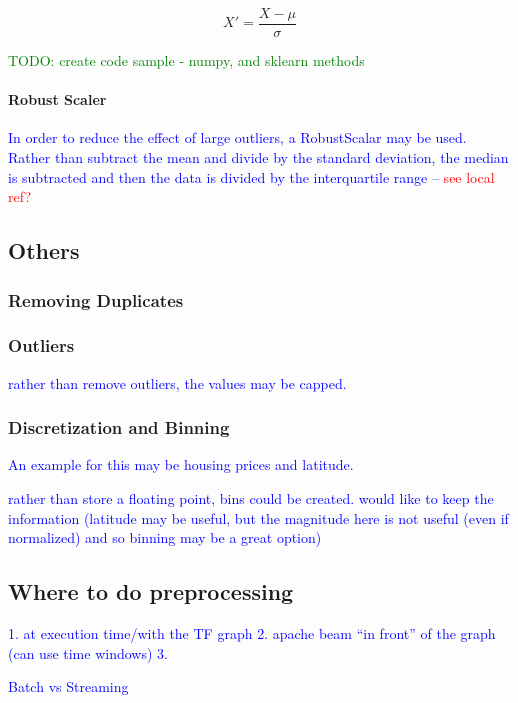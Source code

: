 \begin{equation}
{X' = \frac{X - \mu}{\sigma}}
\label{eq:preprocess_standardization}
\end{equation}

\textcolor{green}{TODO: create code sample - numpy, and sklearn methods}

\paragraph{Robust Scaler}

\textcolor{blue}{In order to reduce the effect of large outliers, a \textcolor{blue}{RobustScalar} may be used. Rather than subtract the mean and divide by the standard deviation, the median is subtracted and then the data is divided by the {interquartile range} -- \textcolor{red}{see local ref?}}


\subsection{Others}

\subsubsection{Removing Duplicates}

\subsubsection{Outliers}

\textcolor{blue}{rather than remove outliers, the values may be capped.}

\subsubsection{Discretization and Binning}

\textcolor{blue}{An example for this may be housing prices and latitude.}



\textcolor{blue}{rather than store a floating point, bins could be created. would like to keep the information (latitude may be useful, but the magnitude here is not useful (even if normalized) and so binning may be a great option)}


\subsection{Where to do preprocessing}

\textcolor{blue}{1. at execution time/with the TF graph}
\textcolor{blue}{2. apache beam ``in front'' of the graph (can use time windows)}
\textcolor{blue}{3. }



\textcolor{blue}{Batch vs Streaming}

